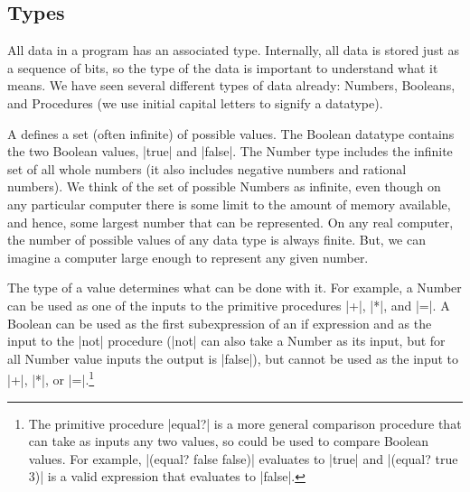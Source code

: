 \begin{schemeregion}

\section{Types}\label{sec:types}

All data in a program has an associated type.  Internally, all data is stored just as a sequence of bits, so the type of the data is important to understand what it means.  We have seen several different types of data already: Numbers, Booleans, and Procedures (we use initial capital letters to signify a datatype).  

A  defines a set (often infinite) of possible values.  The Boolean datatype contains the two Boolean values, \scheme|true| and \scheme|false|.  The Number type includes the infinite set of all whole numbers (it also includes negative numbers and rational numbers).  We think of the set of possible Numbers as infinite, even though on any particular computer there is some limit to the amount of memory available, and hence, some largest number that can be represented.  On any real computer, the number of possible values of any data type is always finite.  But, we can imagine a computer large enough to represent any given number.

The type of a value determines what can be done with it.  For example, a Number can be used as one of the inputs to the primitive procedures \scheme|+|, \scheme|*|, and \scheme|=|.  A Boolean can be used as the first subexpression of an if expression and as the input to the \scheme|not| procedure (|not| can also take a Number as its input, but for all Number value inputs the output is \schemeresult|false|), but cannot be used as the input to \scheme|+|, \scheme|*|, or \scheme|=|.\footnote{The primitive procedure \scheme|equal?| is a more general comparison procedure that can take as inputs any two values, so could be used to compare Boolean values.  For example, \scheme|(equal? false false)| evaluates to \schemeresult|true| and \scheme|(equal? true 3)| is a valid expression that evaluates to \scheme|false|.}  


\end{schemeregion}
